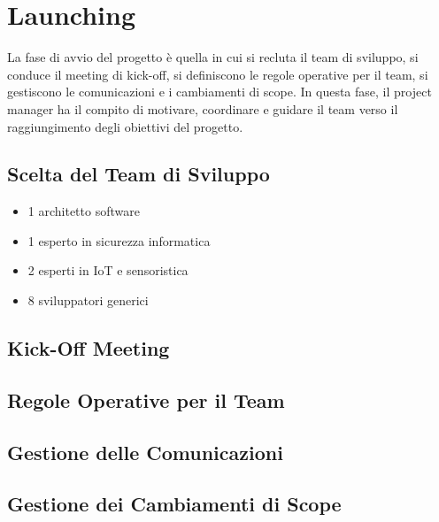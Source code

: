 \chapter{Launching}
La fase di avvio del progetto è quella in cui si recluta il team di sviluppo, si conduce il meeting di kick-off, si definiscono le regole operative per il team, si gestiscono le comunicazioni e i cambiamenti di scope. In questa fase, il project manager ha il compito di motivare, coordinare e guidare il team verso il raggiungimento degli obiettivi del progetto.

\section{Scelta del Team di Sviluppo}

\begin{itemize}
    \item 1 architetto software
    \item 1 esperto in sicurezza informatica
    \item 2 esperti in IoT e sensoristica
    \item 8 sviluppatori generici
\end{itemize}

\section{Kick-Off Meeting}

\section{Regole Operative per il Team}

\section{Gestione delle Comunicazioni}

\section{Gestione dei Cambiamenti di Scope}
